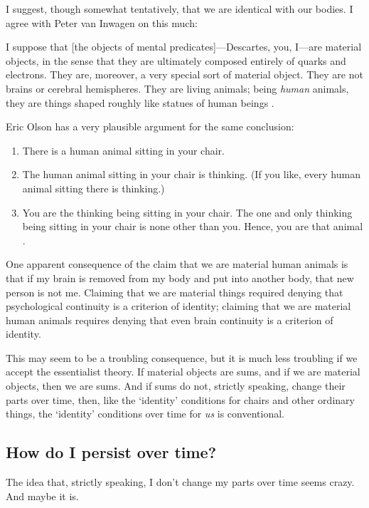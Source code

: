 \documentclass[11pt]{article}
\newenvironment{squote}{%
\begin{spacing}{1}
\begin{list}{}{%
\setlength{\labelwidth}{0pt}%
\rightmargin\leftmargin%
}
\item\relax
}{%
\end{list}%
\end{spacing}
}
\begin{document}
\begin{spacing}{1.5}
I suggest, though somewhat tentatively, that we are identical with our
bodies.  I agree with Peter van Inwagen on this much:

\begin{squote}
I suppose that [the objects of mental predicates]---Descartes, you,
I---are material objects, in the sense that they are ultimately
composed entirely of quarks and electrons.  They are, moreover, a very
special sort of material object.  They are not brains or cerebral
hemispheres.  They are living animals; being {\em human} animals, they
are things shaped roughly like statues of human beings
\citeyearpar[6]{inwagen1995}.
\end{squote}

Eric Olson has a very plausible argument for the same conclusion:

\begin{enumerate}
  \item There is a human animal sitting in your chair.
  \item The human animal sitting in your chair is thinking. (If you
    like, every human animal sitting there is thinking.)
  \item You are the thinking being sitting in your chair. The one and
    only thinking being sitting in your chair is none other than
    you. Hence, you are that animal \citeyearpar[``8'']{olson2003a}.
\end{enumerate}

One apparent consequence of the claim that we are material human
animals is that if my brain is removed from my body and put into
another body, that new person is not me.  Claiming that we are
material things required denying that psychological continuity is a
criterion of identity; claiming that we are material human animals
requires denying that even brain continuity is a criterion of
identity.

This may seem to be a troubling consequence, but it is much less
troubling if we accept the essentialist theory.  If material objects
are sums, and if we are material objects, then we are sums.  And if
sums do not, strictly speaking, change their parts over time, then,
like the `identity' conditions for chairs and other ordinary things,
the `identity' conditions over time for {\em us} is conventional.



\subsection{How do I persist over time?}
\label{person-persist}
The idea that, strictly speaking, I don't change my parts over time
seems crazy.  And maybe it is.


\end{spacing}
\end{document}

